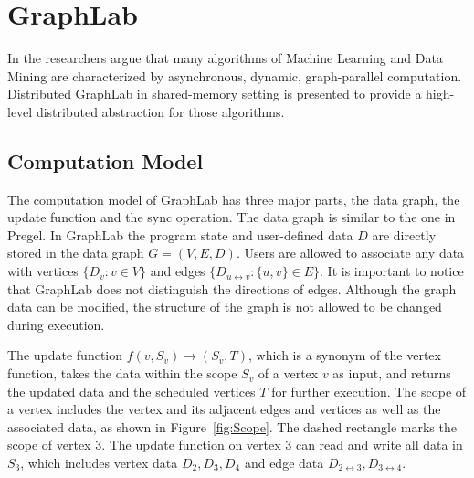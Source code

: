 

\section{GraphLab}

In \cite{Low+al:uai10graphlab} the researchers argue that many algorithms of Machine Learning and Data Mining are characterized by asynchronous, dynamic, graph-parallel computation. Distributed GraphLab in shared-memory setting is presented to provide a high-level distributed abstraction for those algorithms.

\subsection{Computation Model}

The computation model of GraphLab has three major parts, the data graph, the update function and the sync operation. The data graph is similar to the one in Pregel. In GraphLab the program state and user-defined data $D$ are directly stored in the data graph $G=(V,E,D)$. Users are allowed to associate any data with vertices $\{D_v: v \in V\}$ and edges $\{D_{u \leftrightarrow v}: \{u,v\} \in E\}$. It is important to notice that GraphLab does not distinguish the directions of edges. Although the graph data can be modified, the structure of the graph is not allowed to be changed during execution. 

The update function $f(v,S_v) \rightarrow (S_v, T)$, which is a synonym of the vertex function, takes the data within the scope $S_v$ of a vertex $v$ as input, and returns the updated data and the scheduled vertices $T$ for further execution. The scope of a vertex includes the vertex and its adjacent edges and vertices as well as the associated data, as shown in Figure~\ref{fig:Scope}. The dashed rectangle marks the scope of vertex 3. The update function on vertex 3 can read and write all data in $S_3$, which includes vertex data $D_2, D_3, D_4$ and edge data $D_{2 \leftrightarrow 3}, D_{3 \leftrightarrow 4}$.


